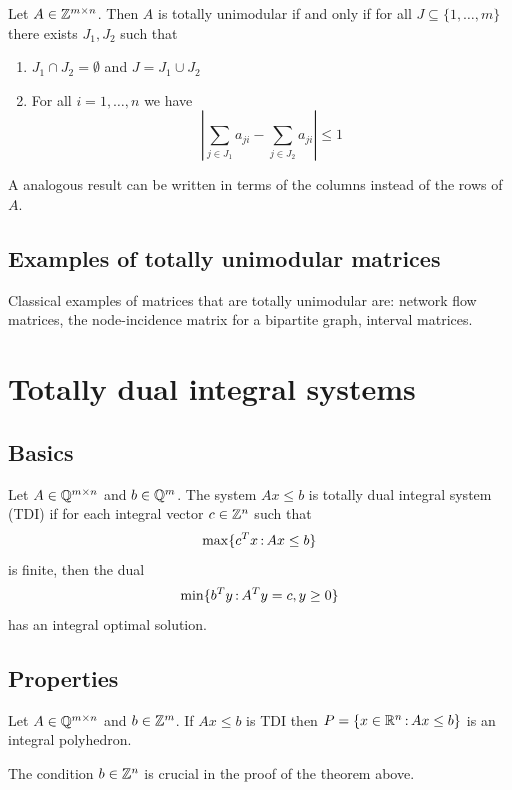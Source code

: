 \documentclass[../open-optimization/open-optimization.tex]{subfiles}
\begin{document}
\begin{theorem}
Let  $A\in{\mathbb{Z}}^{m\times n}$. Then $A$ is totally unimodular if and only if for all $J\subseteq\{1,\dots,m\}$ there exists $J_1,J_2$ such that
\begin{enumerate}
	\item $J_1\cap J_2=\emptyset$ and $J=J_1\cup J_2$
	\item For all $i=1,\dots,n$ we have 
	$$\left|\sum_{j\in J_1}a_{ji}-\sum_{j\in J_2}a_{ji}\right|\leq 1$$
\end{enumerate}
\end{theorem}

\begin{remark} A analogous result can be written in terms of the columns instead of the rows of  $A$.
\end{remark}

\subsection{Examples of totally unimodular matrices}

Classical examples of matrices that are totally unimodular are: network flow matrices, the node-incidence matrix for a bipartite graph, interval matrices.

\section{Totally dual integral systems}

 \subsection{Basics}

\begin{definition}
Let $A\in{\mathbb{Q}}^{m\times n}$ and $b\in{\mathbb{Q}}^m$. The system $Ax\leq b$ is totally dual integral system (TDI) if for each integral vector $c\in{\mathbb{Z}}^n$ such that
$$\max\{c^Tx{\,:\,} Ax\leq b\}$$ 
is finite, then the dual
$$\min\{b^Ty{\,:\,} A^Ty=c, y\geq 0\}$$
has an integral optimal solution. 
\end{definition}


 \subsection{Properties}

\begin{theorem}
Let $A\in{\mathbb{Q}}^{m\times n}$ and $b\in{\mathbb{Z}}^m$. If $Ax\leq b$ is TDI then $P=\{x\in{\mathbb{R}}^n{\,:\,} Ax\leq b\}$
 is an integral polyhedron.
\end{theorem}
\begin{remark} The condition $b\in{\mathbb{Z}}^n$ is crucial in the proof of the theorem above.
\end{remark}
\end{document}
